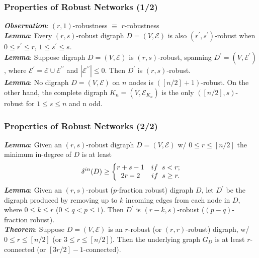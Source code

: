 \documentclass{beamer}
\begin{document}

\begin{frame}
\frametitle{Properties of Robust Networks (1/2)}
\textbf{\textit{Observation}}: $(r,1)$-robustness $\equiv$ $r$-robustness\\
\vspace{.2cm}
\textbf{\textit{Lemma}}: Every $(r,s)$-robust digraph $D=(V, \mathcal{E} )$ is also $(r^{\prime},s^{\prime})$-robust when $0\leq r^{\prime}\leq r$, $1\leq s^{\prime}\leq s$.\\
\vspace{.2cm}
\textbf{\textit{Lemma}}: Suppose digraph $D=(V, \mathcal{E} )$ is  $(r,s)$-robust, spanning  $D^{\prime}=(V, \mathcal{E}^{\prime})$, where $\mathcal{E}^{\prime}=\mathcal{E}\cup \mathcal{E}^{\prime \prime}$ and $|\mathcal{E}^{\prime \prime}|\leq 0$. Then $D^{\prime}$ is $(r,s)$-robust.\\
\vspace{.2cm}
\textbf{\textit{Lemma}}: No digraph $D=(V, \mathcal{E} )$ on $n$ nodes is $([n/2]+1)$-robust. On the other hand, the complete digraph $K_n=(V, \mathcal{E}_{K_n} )$ is the only  $([n/2],s)$-robust for $1\leq s\leq n$ and n odd.

\end{frame}


\begin{frame}
\frametitle{Properties of Robust Networks (2/2)}
\textbf{\textit{Lemma}}: Given an $(r,s)$-robust digraph $D=(V, \mathcal{E} )$ w/ $0\leq r\leq [n/2]$ the minimum in-degree of $D$ is at least
\begin{equation*}
\delta^{in}(D)\geq \bigg\{
  \begin{matrix}
  r+s-1 & if \hspace{.2cm} s<r ;\\
  2r-2 & if \hspace{.2cm} s\geq r .
  \end{matrix}
\end{equation*}
\textbf{\textit{Lemma}}:  Given an $(r,s)$-robust ($p$-fraction robust) digraph $D$, let $D^{\prime}$ be the digraph produced by removing up to $k$ incoming edges from each node in $D$, where $0\leq k\leq r$ ($0\leq q< p\leq 1$). Then $D^{\prime}$ is $(r-k,s)$-robust ($(p-q)$-fraction robust).\\
\textbf{\textit{Theorem}}: Suppose $D=(V, \mathcal{E} )$ is an $r$-robust (or $(r,r)$-robust) digraph, w/ $0\leq r\leq [n/2]$ (or $3\leq r\leq [n/2]$). Then the underlying graph $G_D$ is at least $r$-connected (or $[3r/2]-1$-connected).
\end{frame}
\end{document}
